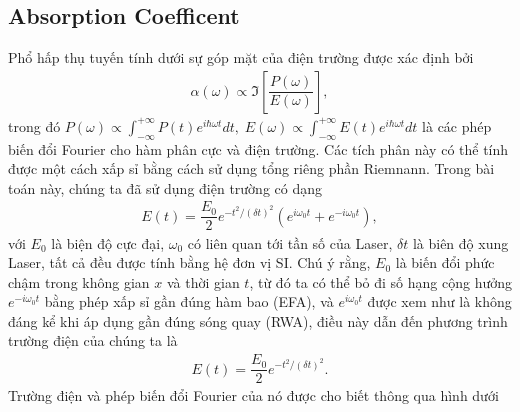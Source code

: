 \documentclass[%
 reprint,
 amsmath,amssymb,
 aps,
]{revtex4-2}
\newcommand{\f}[2]{\dfrac{#1}{#2}}
\begin{document}
\subsection{Absorption Coefficent}
Phổ hấp thụ tuyến tính dưới sự góp mặt của điện trường được xác định bởi \cite{doi:10.1142/7184}
\begin{gather}
	\alpha(\omega) \propto \Im\left[\f{P(\omega)}{E(\omega)}\right],
\end{gather}
trong đó $P(\omega) \propto \int_{-\infty}^{+\infty} P(t) e^{i \hbar \omega t} dt, \; E(\omega) \propto \int_{-\infty}^{+\infty} E(t) e^{i \hbar \omega t} dt$ là các phép biến đổi Fourier cho hàm phân cực và điện trường. Các tích phân này có thể tính được một cách xấp sỉ bằng cách sử dụng tổng riêng phần Riemnann. Trong bài toán này, chúng ta đã sử dụng điện trường có dạng
\begin{gather}
	E(t) = \f{E_{0}}{2} e^{- t^{2} / (\delta t)^{2}} (e^{i\omega_{0} t} + e^{-i\omega_{0} t}),
\end{gather}
với $E_{0}$ là biện độ cực đại, $\omega_{0}$ có liên quan tới tần số của Laser, $\delta t$ là biên độ xung Laser, tất cả đều được tính bằng hệ đơn vị SI. Chú ý rằng, $E_{0}$ là biến đổi phức chậm trong không gian $x$ và thời gian $t$, từ đó ta có thể bỏ đi số hạng cộng hưởng $e^{-i \omega_{0} t}$ bằng phép xấp sỉ gần đúng hàm bao (EFA), và $e^{i \omega_{0} t}$ được xem như là không đáng kể khi áp dụng gần đúng sóng quay (RWA), điều này dẫn đến phương trình trường điện của chúng ta là
\begin{gather}
	E(t) = \f{E_{0}}{2} e^{-t^{2} / (\delta t)^{2}}.
\end{gather}
Trường điện và phép biến đổi Fourier của nó được cho biết thông qua hình dưới \cite{simon2013oxford} \cite{PhysRevLett.108.196802}
\end{document}
